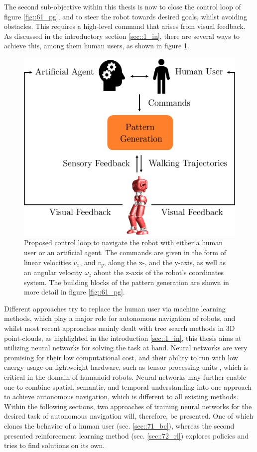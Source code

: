 \label{sec::7_ah}
The second sub-objective within this thesis is now to close the control loop of figure \ref{fig::61_pg}, and to steer the robot towards desired goals, whilst avoiding obstacles. This requires a high-level command that arises from visual feedback. As discussed in the introductory section \ref{sec::1_in}, there are several ways to achieve this, among them human users, as shown in figure \ref{fig::7_cl}.
\begin{figure}[h!]
	\centering
	\includegraphics[scale=.5]{chapters/07_autonomous_high_level_control_of_the_walking_pattern_generator/img/control_loop.png}
	\caption{Proposed control loop to navigate the robot with either a human user or an artificial agent. The commands are given in the form of linear velocities $v_x$, and $v_y$, along the x-, and the y-axis, as well as an angular velocity $\omega_z$ about the z-axis of the robot's coordinates system. The building blocks of the pattern generation are shown in more detail in figure \ref{fig::61_pg}.}
	\label{fig::7_cl}
\end{figure}
Different approaches try to replace the human user via machine learning methods, which play a major role for autonomous navigation of robots, and whilst most recent approaches mainly dealt with tree search methods in 3D point-clouds, as highlighted in the introduction \ref{sec::1_in}, this thesis aims at utilizing neural networks for solving the task at hand. Neural networks are very promising for their low computational cost, and their ability to run with low energy usage on lightweight hardware, such as tensor processing units \cite{jouppi2017datacenter}, which is critical in the domain of humanoid robots. Neural networks may further enable one to combine spatial, semantic, and temporal understanding into one approach to achieve autonomous navigation, which is different to all existing methods. Within the following sections, two approaches of training neural networks for the desired task of autonomous navigation will, therefore, be presented. One of which clones the behavior of a human user (sec. \ref{sec::71_bc}), whereas the second presented reinforcement learning method (sec. \ref{sec::72_rl}) explores policies and tries to find solutions on its own. 